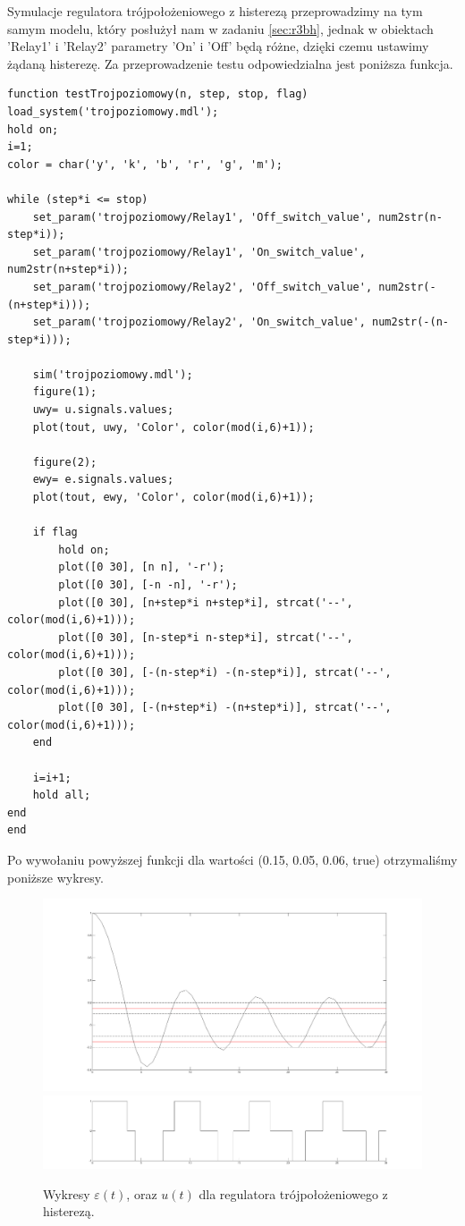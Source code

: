 \documentclass[a4paper,10pt]{article}
\begin{document}
Symulacje regulatora trójpołożeniowego z histerezą przeprowadzimy na tym samym modelu, który posłużył nam w zadaniu \ref{sec:r3bh}, jednak w obiektach 'Relay1' i 'Relay2' parametry 'On' i 'Off' będą różne, dzięki czemu ustawimy żądaną histerezę.
Za przeprowadzenie testu odpowiedzialna jest poniższa funkcja.

\begin{lstlisting}[caption=Funkcja testująca regulator trójpołożeniowy z histerezą.]
function testTrojpoziomowy(n, step, stop, flag)
load_system('trojpoziomowy.mdl');
hold on;
i=1;
color = char('y', 'k', 'b', 'r', 'g', 'm');

while (step*i <= stop)
    set_param('trojpoziomowy/Relay1', 'Off_switch_value', num2str(n-step*i));
    set_param('trojpoziomowy/Relay1', 'On_switch_value', num2str(n+step*i));
    set_param('trojpoziomowy/Relay2', 'Off_switch_value', num2str(-(n+step*i)));
    set_param('trojpoziomowy/Relay2', 'On_switch_value', num2str(-(n-step*i)));

    sim('trojpoziomowy.mdl');
    figure(1);
    uwy= u.signals.values;    
    plot(tout, uwy, 'Color', color(mod(i,6)+1));

    figure(2);
    ewy= e.signals.values;    
    plot(tout, ewy, 'Color', color(mod(i,6)+1));

    if flag
        hold on;
        plot([0 30], [n n], '-r');
        plot([0 30], [-n -n], '-r');
        plot([0 30], [n+step*i n+step*i], strcat('--', color(mod(i,6)+1)));
        plot([0 30], [n-step*i n-step*i], strcat('--', color(mod(i,6)+1)));
        plot([0 30], [-(n-step*i) -(n-step*i)], strcat('--', color(mod(i,6)+1)));
        plot([0 30], [-(n+step*i) -(n+step*i)], strcat('--', color(mod(i,6)+1)));
    end

    i=i+1;
    hold all;
end
end
\end{lstlisting}

Po wywołaniu powyższej funkcji dla wartości (0.15, 0.05, 0.06, true) otrzymaliśmy poniższe wykresy.

\begin{figure}[!h]
    \centering
	\includegraphics[width=120mm]{CW3-trojpolozeniowy-e-n015-a005.png}
	\includegraphics[width=120mm]{CW3-trojpolozeniowy-u-n015-a005.png}
	\caption{Wykresy $\varepsilon(t)$, oraz $u(t)$ dla regulatora trójpołożeniowego z histerezą.}
    \label{fig:Rysunek}
\end{figure}
\end{document}
